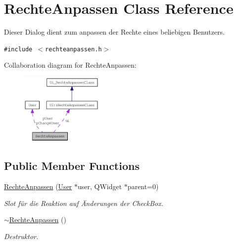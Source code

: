 \hypertarget{class_rechte_anpassen}{
\section{RechteAnpassen Class Reference}
\label{class_rechte_anpassen}
}
Dieser Dialog dient zum anpassen der Rechte eines beliebigen Benutzers.  


{\tt \#include $<$rechteanpassen.h$>$}

Collaboration diagram for RechteAnpassen:\nopagebreak
\begin{figure}[H]
\begin{center}
\leavevmode
\includegraphics[width=114pt]{class_rechte_anpassen__coll__graph}
\end{center}
\end{figure}
\subsection*{Public Member Functions}
\begin{CompactItemize}
\item 
\hyperlink{class_rechte_anpassen_aef2a4160afa6afb2bdc2040f01e92ce}{RechteAnpassen} (\hyperlink{class_user}{User} $\ast$user, QWidget $\ast$parent=0)
\begin{CompactList}\small\item\em Slot für die Reaktion auf Änderungen der CheckBox. \item\end{CompactList}\item 
\hyperlink{class_rechte_anpassen_e520e6bb6a291ce8db7fb9ff08f18ecf}{$\sim$RechteAnpassen} ()
\begin{CompactList}\small\item\em Destruktor. \item\end{CompactList}\end{CompactItemize}
